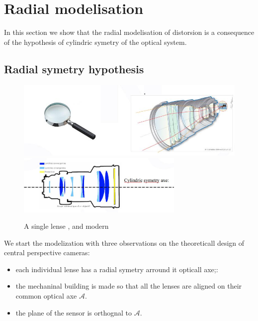 
\section{Radial modelisation}

\label{RadMod}

In this section we  show that the radial modelisation of distorsion is a consequence
of the hypothesis of cylindric symetry of the optical system.


\subsection{Radial symetry hypothesis}

\begin{figure}
\centering
	\includegraphics[width=12cm]{Methods/Images/Lenses.jpg} \\
	\includegraphics[width=8cm]{Methods/Images/LensesCyl.jpg}
	\caption{A single lense , and modern }
	\label{fig:Lenses}
\end{figure}

We start the modelization with three observations on the theoreticall design of central perspective cameras:

\begin{itemize}
    \item  each individual lense has a radial symetry arround it opticall axe;:
    \item  the mechaninal building is made so that all the lenses are aligned on
	    their common optical axe $\mathcal{A}$.
    \item  the plane of the sensor is orthognal to $\mathcal{A}$.
\end{itemize}

